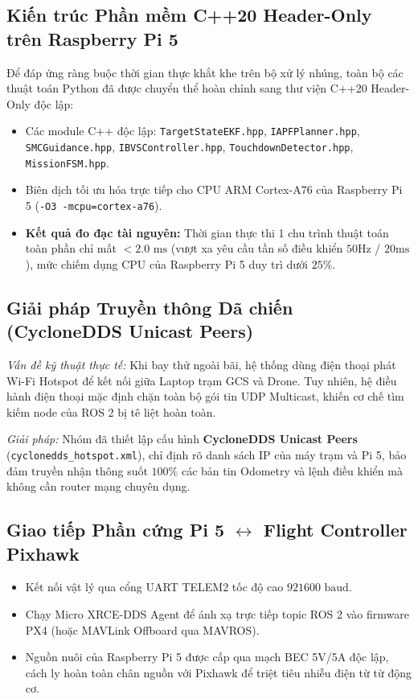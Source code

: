 \documentclass[12pt,a4paper]{article}
\begin{document}
\subsection{Kiến trúc Phần mềm C++20 Header-Only trên Raspberry Pi 5}
Để đáp ứng ràng buộc thời gian thực khắt khe trên bộ xử lý nhúng, toàn bộ các thuật toán Python đã được chuyển thể hoàn chỉnh sang thư viện C++20 Header-Only độc lập:
\begin{itemize}[noitemsep,topsep=2pt]
    \item Các module C++ độc lập: \texttt{TargetStateEKF.hpp}, \texttt{IAPFPlanner.hpp}, \texttt{SMCGuidance.hpp}, \texttt{IBVSController.hpp}, \texttt{TouchdownDetector.hpp}, \texttt{MissionFSM.hpp}.
    \item Biên dịch tối ưu hóa trực tiếp cho CPU ARM Cortex-A76 của Raspberry Pi 5 (\texttt{-O3 -mcpu=cortex-a76}).
    \item \textbf{Kết quả đo đạc tài nguyên:} Thời gian thực thi 1 chu trình thuật toán toàn phần chỉ mất \textbf{$< 2.0\text{ ms}$} (vượt xa yêu cầu tần số điều khiển $50\text{Hz}$ / $20\text{ms}$), mức chiếm dụng CPU của Raspberry Pi 5 duy trì dưới $25\%$.
\end{itemize}

\subsection{Giải pháp Truyền thông Dã chiến (CycloneDDS Unicast Peers)}
\textit{Vấn đề kỹ thuật thực tế:} Khi bay thử ngoài bãi, hệ thống dùng điện thoại phát Wi-Fi Hotspot để kết nối giữa Laptop trạm GCS và Drone. Tuy nhiên, hệ điều hành điện thoại mặc định chặn toàn bộ gói tin UDP Multicast, khiến cơ chế tìm kiếm node của ROS 2 bị tê liệt hoàn toàn.

\noindent
\textit{Giải pháp:} Nhóm đã thiết lập cấu hình \textbf{CycloneDDS Unicast Peers} (\texttt{cyclonedds\_hotspot.xml}), chỉ định rõ danh sách IP của máy trạm và Pi 5, bảo đảm truyền nhận thông suốt $100\%$ các bản tin Odometry và lệnh điều khiển mà không cần router mạng chuyên dụng.

\subsection{Giao tiếp Phần cứng Pi 5 $\leftrightarrow$ Flight Controller Pixhawk}
\begin{itemize}[noitemsep,topsep=2pt]
    \item Kết nối vật lý qua cổng UART TELEM2 tốc độ cao $921600\text{ baud}$.
    \item Chạy Micro XRCE-DDS Agent để ánh xạ trực tiếp topic ROS 2 vào firmware PX4 (hoặc MAVLink Offboard qua MAVROS).
    \item Nguồn nuôi của Raspberry Pi 5 được cấp qua mạch BEC 5V/5A độc lập, cách ly hoàn toàn chân nguồn với Pixhawk để triệt tiêu nhiễu điện từ từ động cơ.
\end{itemize}
\end{document}
